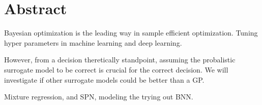 \section*{Abstract}
Bayesian optimization is the leading way in sample efficient optimization. Tuning
hyper parameters in machine learning and deep learning. 

However, from a decision theretically standpoint, assuming the probalistic surrogate model to be correct 
is crucial for the correct decision. We will investigate if other surrogate models 
could be better than a GP. 

Mixture regression, and SPN, modeling the trying out BNN.







